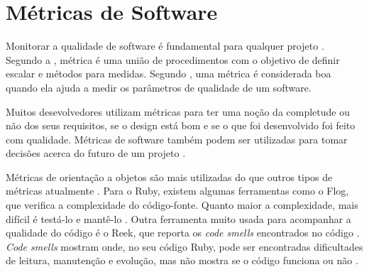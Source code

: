 \section{Métricas de Software}

Monitorar a qualidade de software é fundamental para qualquer projeto \cite{prmm}. Segundo a , métrica é uma união de procedimentos com o objetivo de definir escalar e métodos para medidas. Segundo , uma métrica é considerada boa quando ela ajuda a medir os parâmetros de qualidade de um software. 

Muitos desevolvedores utilizam métricas para ter uma noção da completude ou não dos seus requisitos, se o design está bom e se o que foi desenvolvido foi feito com qualidade. Métricas de software também podem ser utilizadas para tomar decisões acerca do futuro de um projeto \cite{metrics-book}.

Métricas de orientação a objetos são mais utilizadas do que outros tipos de métricas atualmente \cite{danijel}. Para o Ruby, existem algumas ferramentas como o Flog, que verifica a complexidade do código-fonte. Quanto maior a complexidade, mais difícil é testá-lo e mantê-lo \cite{flog}. Outra ferramenta muito usada para acompanhar a qualidade do código é o Reek, que reporta os \textit{code smells} encontrados no código \cite{reek}. \textit{Code smells} mostram onde, no seu código Ruby, pode ser encontradas dificultades de leitura, manutenção e evolução, mas não mostra se o código funciona ou não \cite{codesmells}.

